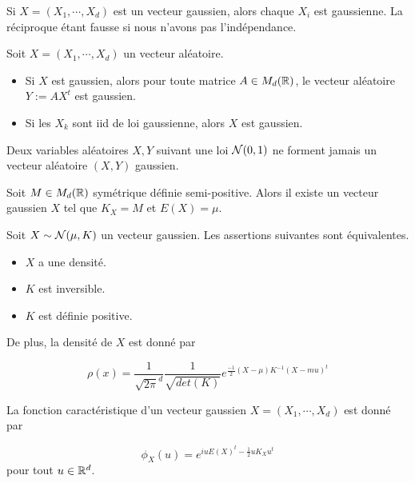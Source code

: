 \begin{remarque}
	Si $X = (X_{1}, \cdots, X_{d})$ est un vecteur gaussien, alors chaque
	$X_{i}$ est gaussienne. La réciproque étant fausse si nous n'avons pas
	l'indépendance.
\end{remarque}

\begin{proposition}
	Soit $X = (X_{1}, \cdots, X_{d})$ un vecteur aléatoire.
	\begin{itemize}
		\item Si $X$ est gaussien, alors pour toute matrice $A \in M_{d}(\mathbb{R})$, le vecteur aléatoire $Y := A
			X^{t}$ est gaussien.
		\item Si les $X_{k}$ sont iid de loi gaussienne, alors $X$ est gaussien.
	\end{itemize}
\end{proposition}

\begin{remarque}
	Deux variables aléatoires $X, Y$ suivant une loi $\mathcal{N}(0, 1)$ ne
	forment jamais un vecteur aléatoire $(X, Y)$ gaussien.
\end{remarque}

\begin{theorem}
	Soit $M \in M_{d}(\mathbb{R})$ symétrique définie semi-positive. Alors
	il existe un vecteur gaussien $X$ tel que $K_{X} = M$ et $E(X) = \mu$.
\end{theorem}

\begin{proposition}
	Soit $X \sim \mathcal{N}(\mu, K)$ un vecteur gaussien. Les assertions
	suivantes sont équivalentes.

	\begin{itemize}
		\item $X$ a une densité.
		\item $K$ est inversible.
		\item $K$ est définie positive.
	\end{itemize}

	De plus, la densité de $X$ est donné par

	\begin{equation}
		\rho(x) = \frac{1}{\sqrt{2 \pi}^{d}} \frac{1}{\sqrt{det(K)}}
		e^{\frac{-1}{2} (X - \mu) K^{-1} (X - mu)^{t}}
	\end{equation}
\end{proposition}

\begin{proposition}
	La fonction caractéristique d'un vecteur gaussien $X = (X_{1}, \cdots,
	X_{d})$ est donné par

	\begin{equation}
		\phi_{X}(u) = e^{iu E(X)^{t} - \frac{1}{2} u K_{X} u^{t}}
	\end{equation}
	pour tout $u \in \mathbb{R}^{d}$.
\end{proposition}

